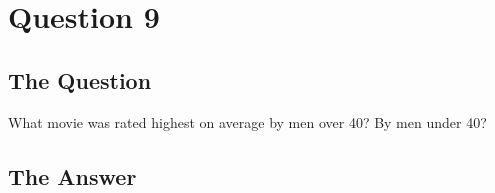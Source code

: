 \section{Question 9}

\subsection{The Question}

\begin{flushleft}

What movie was rated highest on average by men over 40? By men
under 40?

\end{flushleft}
\subsection{The Answer}


